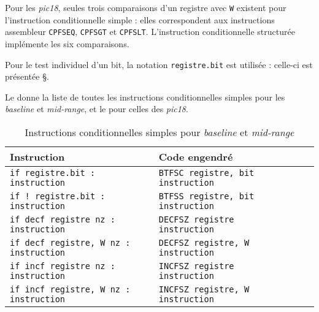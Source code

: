 Pour les \emph{pic18}, seules trois comparaisons d’un registre avec \texttt{W} existent pour l’instruction conditionnelle simple : elles correspondent aux instructions assembleur \texttt{CPFSEQ}, \texttt{CPFSGT} et \texttt{CPFSLT}. L’instruction conditionnelle structurée implémente les six comparaisons.

Pour le test individuel d’un bit, la notation \texttt{registre.bit} est utilisée : celle-ci est présentée §.

Le  donne la liste de toutes les instructions conditionnelles simples pour les \emph{baseline} et \emph{mid-range}, et le  pour celles des \emph{pic18}.

\begin{table}[!ht]
  \centering
  \small
  \begin{tabular}{lp{4cm}lll}
    \textbf{Instruction} & \textbf{Code engendré}\\
    \hline
    \texttt{if registre.bit : instruction} & \texttt{BTFSC registre, bit instruction} \\
    \texttt{if ! registre.bit : instruction} & \texttt{BTFSS registre, bit instruction} \\
    \texttt{if decf registre nz : instruction} & \texttt{DECFSZ registre instruction} \\
    \texttt{if decf registre, W nz : instruction} & \texttt{DECFSZ registre, W instruction} \\
    \texttt{if incf registre nz : instruction} & \texttt{INCFSZ registre instruction} \\
    \texttt{if incf registre, W nz : instruction} & \texttt{INCFSZ registre, W instruction} \\
    \hline
  \end{tabular}
  \caption{Instructions conditionnelles simples pour \emph{baseline} et \emph{mid-range}}
\end{table}

